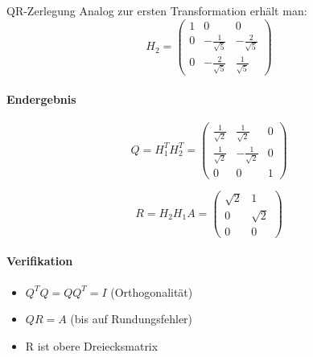 \begin{example2}{QR-Zerlegung}
Analog zur ersten Transformation erhält man:
$$H_2 = \begin{pmatrix}
1 & 0 & 0\\
0 & -\frac{1}{\sqrt{5}} & -\frac{2}{\sqrt{5}}\\
0 & -\frac{2}{\sqrt{5}} & \frac{1}{\sqrt{5}}
\end{pmatrix}$$

\paragraph{Endergebnis}
$$Q = H_1^TH_2^T = \begin{pmatrix}
\frac{1}{\sqrt{2}} & \frac{1}{\sqrt{2}} & 0\\
\frac{1}{\sqrt{2}} & -\frac{1}{\sqrt{2}} & 0\\
0 & 0 & 1
\end{pmatrix}$$

$$R = H_2H_1A = \begin{pmatrix}
\sqrt{2} & 1\\
0 & \sqrt{2}\\
0 & 0
\end{pmatrix}$$

\paragraph{Verifikation}
\begin{itemize}
    \item $Q^TQ = QQ^T = I$ (Orthogonalität)
    \item $QR = A$ (bis auf Rundungsfehler)
    \item R ist obere Dreiecksmatrix
\end{itemize}
\end{example2}



